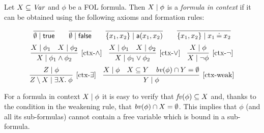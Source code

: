 \begin{definition}
	\label{def:formula in context}
	Let $X \subseteq \mathit{Var}$ and $\phi$ be a FOL formula. Then ${X} \mid {\phi}$ is a \emph{formula in context} if it can be obtained using the following axioms and formation rules:
	
	$$\infer{\ctx{\emptyset}{\True}}{} \qquad 
	\infer{\ctx{\emptyset}{\False}}{} \qquad 
	\infer{\ctx{\{x_1, x_2\}}{\la(x_1,x_2)}}{} \qquad 
	\infer{\ctx{\{x_1, x_2\}}{x_1\Eq x_2}}{}$$
	$$\infer[{[\mbox{ctx-}\wedge]}]{\ctx{X}{\phi_1 \wedge \phi_2}}{\ctx{X}{\phi_1} & \ctx{X}{\phi_2}} \quad 
	\infer[{[\mbox{ctx-}\vee]}]{\ctx{X}{\phi_1 \vee \phi_2}}{\ctx{X}{\phi_1} & \ctx{X}{\phi_2}} \quad 
	\infer[{[\mbox{ctx-}\neg]}]{\ctx{X}{\neg \phi}}{\ctx{X}{\phi}}$$
	$$\infer[{[\mbox{ctx-}\exists]}]{\ctx{Z \setminus X}{\exists X \st\phi}}{\ctx{Z}{\phi}} \quad 
\infer[{[\mbox{ctx-weak}]}]{\ctx{Y}{\phi}}{\ctx{X}{\phi} & X\subseteq Y & \bv(\phi)\cap Y = \emptyset}$$
\end{definition}
%
For a formula in context ${X} \mid {\phi}$ it is easy to verify that $\mathit{fv}(\phi) \subseteq X$ and, thanks to the condition in the weakening rule, that $\mathit{bv}(\phi) \cap X = \emptyset$. This implies that $\phi$ (and all its sub-formulas) cannot contain a free variable which is bound in a sub-formula. 

